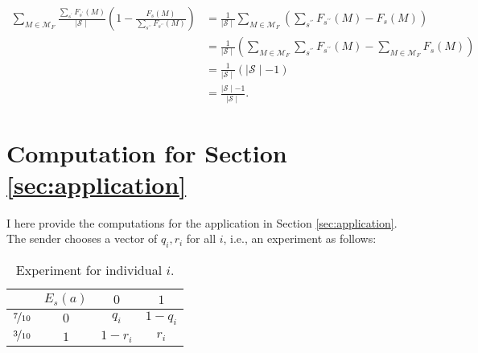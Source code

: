 \begin{align*}
	\sum_{M \in \mathcal{M}_F} \frac{\sum_{s^{\prime}} F_{s^{\prime}} \left( M \right)}{ \mid \mathcal{S} \mid} \left( 1 - \frac{F_s \left( M \right)}{ \sum_{s^{\prime \prime}} F_{s^{\prime \prime}} \left( M \right)} \right) & = \frac{1}{\mid \mathcal{S} \mid} \sum_{M \in \mathcal{M}_F} \left( \sum_{s^{\prime \prime}} F_{s^{\prime \prime}} \left( M \right) - F_s \left( M \right) \right)                            \\
	                                                                                                                                                                                                                             & = \frac{1}{\mid \mathcal{S} \mid} \left( \sum_{M \in \mathcal{M}_F} \sum_{s^{\prime \prime}} F_{s^{\prime \prime}} \left( M \right) - \sum_{M \in \mathcal{M}_F} F_s \left( M \right) \right) \\
	                                                                                                                                                                                                                             & = \frac{1}{\mid \mathcal{S} \mid} \left( \mid \mathcal{S} \mid - 1 \right)                                                                                                                    \\
	                                                                                                                                                                                                                             & = \frac{\mid \mathcal{S} \mid - 1}{\mid \mathcal{S} \mid} .
\end{align*}

\section{Computation for Section \ref{sec:application}}\label{app:application}

I here provide the computations for the application in Section \ref{sec:application}. The sender chooses a vector of \( q_i, r_i \) for all \( i \), i.e., an experiment as follows:

\begin{table}[H]
	\centering
	\begin{tabular}{c c | c c}
		                       & \( E_s \left( a \right) \) & \( 0 \)       & \( 1 \)     \\
		\hline
		\( \nicefrac{7}{10} \) & \( 0 \)                    & \( q_i \)     & \( 1-q_i \) \\
		\( \nicefrac{3}{10} \) & \( 1 \)                    & \( 1 - r_i \) & \( r_i \)   \\
	\end{tabular}
	\caption{Experiment for individual \( i \).}
	\label{tab:experiment3}
\end{table}

